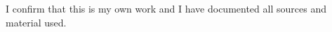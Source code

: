 \thispagestyle{empty}
\vspace*{0.8\textheight}
\noindent
I confirm that this \MakeLowercase{\getDoctype{}} is my own work and I have documented all sources and material used.

\vspace{15mm}
\noindent
\getSubmissionLocation{} \hspace{50mm} \getAuthor{}

\cleardoublepage{}
